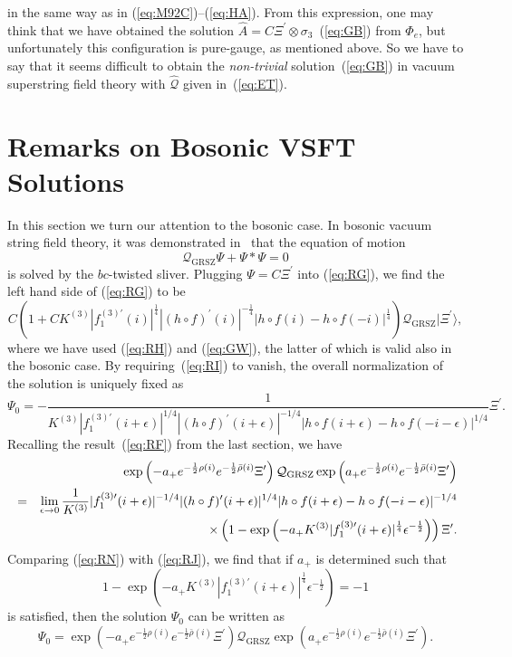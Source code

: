 \documentclass[a4paper,12pt]{article}
\newcommand{\cQ}{\mathcal{Q}}
\newcommand{\Qmid}{\cQ_{\mathrm{GRSZ}}}
\newcommand{\sectiono}[1]{\section{#1}\setcounter{equation}{0}}
\begin{document}
in the same way as in (\ref{eq:M92C})--(\ref{eq:HA}).
From this expression, one may think that we have obtained the solution 
$\widehat{A}=C\Xi^{\prime}\otimes\sigma_3$~(\ref{eq:GB}) from 
$\widehat{\Phi}_e$, but unfortunately 
this configuration is pure-gauge, as mentioned above. So we have to say that it 
seems difficult to obtain the \textit{non-trivial} solution~(\ref{eq:GB}) in vacuum 
superstring field theory with $\widehat{\cQ}$ given in~(\ref{eq:ET}).


\sectiono{Remarks on Bosonic VSFT Solutions}\label{sec:5}
In this section we turn our attention to the bosonic case. 
In bosonic vacuum string field theory, it was demonstrated in~\cite{GRSZ1} that the equation of motion 
\begin{equation}
\Qmid \Psi + \Psi * \Psi = 0 \label{eq:RG}
\end{equation}
is solved by the $bc$-twisted sliver. Plugging $\Psi=C\Xi^{\prime}$ into (\ref{eq:RG}), 
we find the left hand side of (\ref{eq:RG}) to be 
\begin{equation}
C\left(1+CK^{(3)}|f^{(3)\prime}_1(i)|^{\frac{1}{4}}|(h\circ f)^{\prime}(i)|^{-\frac{1}{4}}
|h\circ f(i)-h\circ f(-i)|^{\frac{1}{4}}\right)\Qmid|\Xi^{\prime}\rangle, \label{eq:RI}
\end{equation}
where we have used (\ref{eq:RH}) and (\ref{eq:GW}), the latter of which is valid also in the 
bosonic case. By requiring~(\ref{eq:RI}) to vanish, the overall normalization of the 
solution is uniquely fixed as 
\begin{equation}
\Psi_0=-\frac{1}{K^{(3)}|f^{(3)\prime}_1(i+\epsilon)|^{1/4}|(h\circ f)^{\prime}(i+\epsilon)|^{-1/4}
|h\circ f(i+\epsilon)-h\circ f(-i-\epsilon)|^{1/4}}\Xi^{\prime}. \label{eq:RJ}
\end{equation}
Recalling the result~(\ref{eq:RF}) from the last section, we have 
\begin{eqnarray}
& &\hspace{-1cm}\exp\left(-a_+e^{-\frac{1}{2}\rho(i)}e^{-\frac{1}{2}\bar{\rho}(i)}\Xi^{\prime}\right)\Qmid 
\exp\left(a_+e^{-\frac{1}{2}\rho(i)}e^{-\frac{1}{2}\bar{\rho}(i)}\Xi^{\prime}\right) \nonumber \\
&=&\lim_{\epsilon\to 0}\frac{1}{K^{(3)}}|f^{(3)\prime}_1(i+\epsilon)|^{-1/4}
|(h\circ f)^{\prime}(i+\epsilon)|^{1/4}|h\circ f(i+\epsilon)-h\circ f(-i-\epsilon)|^{-1/4}\nonumber \\ & &\times
\left( 1-\exp\left(-a_+K^{(3)}|f^{(3)\prime}_1(i+\epsilon)|^{\frac{1}{4}}\epsilon^{-\frac{1}{2}}
\right)\right)\Xi^{\prime}. \label{eq:RN}
\end{eqnarray}
Comparing (\ref{eq:RN}) with (\ref{eq:RJ}), we find that if $a_+$ is determined such that 
\begin{equation}
1-\exp\left(-a_+K^{(3)}|f^{(3)\prime}_1(i+\epsilon)|^{\frac{1}{4}}\epsilon^{-\frac{1}{2}}
\right)=-1 \label{eq:RO}
\end{equation}
is satisfied, then the solution $\Psi_0$ can be written as 
\begin{equation}
\Psi_0=\exp\left(-a_+e^{-\frac{1}{2}\rho(i)}e^{-\frac{1}{2}\bar{\rho}(i)}\Xi^{\prime}\right)\Qmid 
\exp\left(a_+e^{-\frac{1}{2}\rho(i)}e^{-\frac{1}{2}\bar{\rho}(i)}\Xi^{\prime}\right). \label{eq:RP}
\end{equation}
\end{document}
